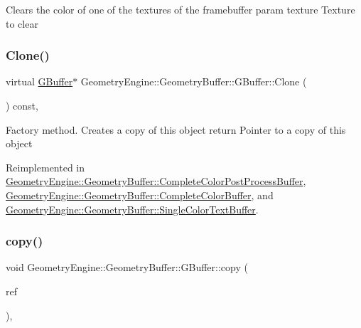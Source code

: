 Clears the color of one of the textures of the framebuffer param texture Texture to clear \mbox{\label{class_geometry_engine_1_1_geometry_buffer_1_1_g_buffer_af993f8c23f7e78051f3071be4873af9d}} 
\subsubsection{\texorpdfstring{Clone()}{Clone()}}
{\footnotesize\ttfamily virtual \mbox{\hyperlink{class_geometry_engine_1_1_geometry_buffer_1_1_g_buffer}{G\+Buffer}}$\ast$ Geometry\+Engine\+::\+Geometry\+Buffer\+::\+G\+Buffer\+::\+Clone (\begin{DoxyParamCaption}{ }\end{DoxyParamCaption}) const\hspace{0.3cm}{\ttfamily [inline]}, {\ttfamily [virtual]}}

Factory method. Creates a copy of this object return Pointer to a copy of this object 

Reimplemented in \mbox{\hyperlink{class_geometry_engine_1_1_geometry_buffer_1_1_complete_color_post_process_buffer_a8a484d5196bba7b92f31e500229743bc}{Geometry\+Engine\+::\+Geometry\+Buffer\+::\+Complete\+Color\+Post\+Process\+Buffer}}, \mbox{\hyperlink{class_geometry_engine_1_1_geometry_buffer_1_1_complete_color_buffer_a56aee74c7523f0b16fd8b97c8c44f84f}{Geometry\+Engine\+::\+Geometry\+Buffer\+::\+Complete\+Color\+Buffer}}, and \mbox{\hyperlink{class_geometry_engine_1_1_geometry_buffer_1_1_single_color_text_buffer_add00c2857f9d425600ef83d50a9c8019}{Geometry\+Engine\+::\+Geometry\+Buffer\+::\+Single\+Color\+Text\+Buffer}}.

\mbox{\label{class_geometry_engine_1_1_geometry_buffer_1_1_g_buffer_a9f20eb78703ef048d59a54f90ee09f25}} 
\subsubsection{\texorpdfstring{copy()}{copy()}}
{\footnotesize\ttfamily void Geometry\+Engine\+::\+Geometry\+Buffer\+::\+G\+Buffer\+::copy (\begin{DoxyParamCaption}\item[{const \mbox{\hyperlink{class_geometry_engine_1_1_geometry_buffer_1_1_g_buffer}{G\+Buffer}} \&}]{ref }\end{DoxyParamCaption})\hspace{0.3cm}{\ttfamily [protected]}, {\ttfamily [virtual]}}

